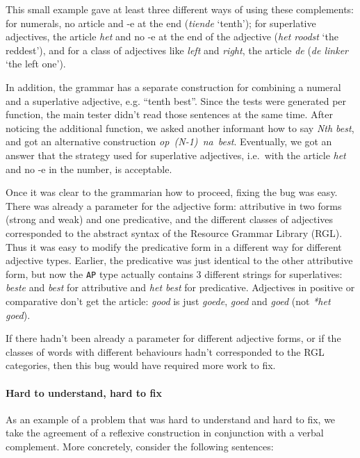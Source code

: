 This small example gave at least three different ways of using these
complements: for numerals, no article and -e at the end (\emph{tiende}
`tenth'); for superlative adjectives, the article \emph{het} and no -e
at the end of the adjective (\emph{het roodst} `the reddest'), and for
a class of adjectives like \emph{left} and \emph{right}, the article
\emph{de} (\emph{de linker} `the left one').

In addition, the grammar has a separate construction for combining a
numeral and a superlative adjective, e.g. ``tenth best''. Since the
tests were generated per function, the main tester didn't read those
sentences at the same time. After noticing the additional function, we
asked another informant how to say \emph{Nth best}, and got an
alternative construction \mbox{\emph{op~(N-1)~na~best}}. Eventually, we got an
answer that the strategy used for superlative adjectives, i.e.~with the
article \emph{het} and no -e in the number, is acceptable.

Once it was clear to the grammarian how to proceed, fixing the bug was
easy. There was already a parameter for the adjective form: attributive
in two forms (strong and weak) and one predicative, and the different
classes of adjectives corresponded to the abstract syntax of the \gf{}
Resource Grammar Library (RGL).
Thus it was easy to modify the predicative form in a different way for
different adjective types. Earlier, the predicative was just identical
to the other attributive form, but now the \texttt{AP} type actually
contains 3 different strings for superlatives: \emph{beste} and
\emph{best} for attributive and \emph{het best} for predicative.
Adjectives in positive or comparative don't get the article: \emph{good}
is just \emph{goede}, \emph{goed} and \emph{goed} (not \emph{*het
goed}).

If there hadn't been already a parameter for different adjective forms,
or if the classes of words with different behaviours hadn't corresponded
to the RGL categories, then this bug would have required more work to fix.

\paragraph{Hard to understand, hard to
fix}\label{hard-to-understand-hard-to-fix}

As an example of a problem that was hard to understand and hard to fix,
we take the agreement of a reflexive construction in conjunction with a
verbal complement. More concretely, consider the following sentences:

